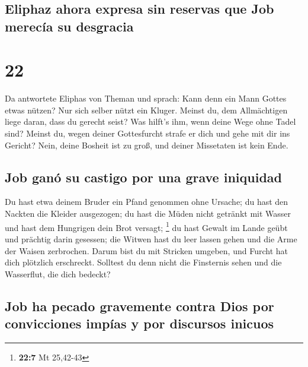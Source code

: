 \hypertarget{eliphaz-ahora-expresa-sin-reservas-que-job-merecuxeda-su-desgracia}{%
\subsection{Eliphaz ahora expresa sin reservas que Job merecía su
desgracia}\label{eliphaz-ahora-expresa-sin-reservas-que-job-merecuxeda-su-desgracia}}

\hypertarget{section-21}{%
\section{22}\label{section-21}}

 Da antwortete Eliphas von Theman und sprach:
 Kann denn ein Mann Gottes etwas nützen? Nur sich selber
nützt ein Kluger.  Meinst du, dem Allmächtigen liege
daran, dass du gerecht seist? Was hilft's ihm, wenn deine Wege ohne
Tadel sind?  Meinst du, wegen deiner Gottesfurcht strafe
er dich und gehe mit dir ins Gericht?  Nein, deine Bosheit
ist zu groß, und deiner Missetaten ist kein Ende.

\hypertarget{job-ganuxf3-su-castigo-por-una-grave-iniquidad}{%
\subsection{Job ganó su castigo por una grave
iniquidad}\label{job-ganuxf3-su-castigo-por-una-grave-iniquidad}}

 Du hast etwa deinem Bruder ein Pfand genommen ohne
Ursache; du hast den Nackten die Kleider ausgezogen;  du
hast die Müden nicht getränkt mit Wasser und hast dem Hungrigen dein
Brot versagt; \footnote{\textbf{22:7} Mt 25,42-43}  du
hast Gewalt im Lande geübt und prächtig darin gesessen; 
die Witwen hast du leer lassen gehen und die Arme der Waisen zerbrochen.
 Darum bist du mit Stricken umgeben, und Furcht hat dich
plötzlich erschreckt.  Solltest du denn nicht die
Finsternis sehen und die Wasserflut, die dich bedeckt?

\hypertarget{job-ha-pecado-gravemente-contra-dios-por-convicciones-impuxedas-y-por-discursos-inicuos}{%
\subsection{Job ha pecado gravemente contra Dios por convicciones impías
y por discursos
inicuos}\label{job-ha-pecado-gravemente-contra-dios-por-convicciones-impuxedas-y-por-discursos-inicuos}}


